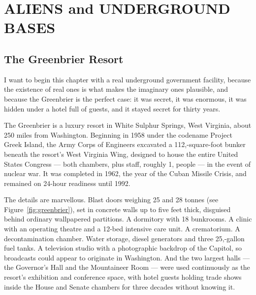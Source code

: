 \chapter{ALIENS and UNDERGROUND BASES}\label{ch:underground}


\section{The Greenbrier Resort}\label{sec:underground}

I want to begin this chapter with a real underground government facility, because the existence of
real ones is what makes the imaginary ones plausible, and because the Greenbrier is the perfect
case: it was secret, it was enormous, it was hidden under a hotel full of guests, and it stayed
secret for thirty years.

The Greenbrier is a luxury resort in White Sulphur Springs, West Virginia, about 250 miles from
Washington. Beginning in 1958 under the codename Project Greek Island, the Army Corps of Engineers
excavated a 112,-square-foot bunker beneath the resort's West Virginia Wing, designed to house
the entire United States Congress --- both chambers, plus staff, roughly 1, people --- in the
event of nuclear war. It was completed in 1962, the year of the Cuban Missile Crisis, and remained
on 24-hour readiness until 1992.

The details are marvellous. Blast doors weighing 25 and 28 tonnes (see Figure~\ref{fig:greenbrier}), set in concrete walls up to five
feet thick, disguised behind ordinary wallpapered partitions. A dormitory with 18 bunkrooms. A
clinic with an operating theatre and a 12-bed intensive care unit. A crematorium. A decontamination
chamber. Water storage, diesel generators and three 25,-gallon fuel tanks. A television studio
with a photographic backdrop of the Capitol, so broadcasts could appear to originate in Washington.
And the two largest halls --- the Governor's Hall and the Mountaineer Room --- were used
continuously as the resort's exhibition and conference space, with hotel guests holding trade shows
inside the House and Senate chambers for three decades without knowing it.

